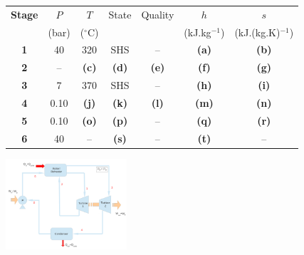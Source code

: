 \documentclass[10pt,compress]{beamer}
\begin{document}
\begin{frame}
       \begin{center}
         \begin{tabular}{c | c c c c c c  }
           \hline\scriptsize
           {\bf Stage} & $P$    & $T$             &  State       & Quality     & $h$                 & $s$                      \\
                       & (bar)  & ($^{\circ}$C)    &              &             & (kJ.kg$^{-1}$)       & (kJ.(kg.K)$^{-1}$)        \\
           \hline
            {\bf 1 }   & 40         & 320         & SHS          & --          & {\bf (a)}           & {\bf (b)}                 \\
            {\bf 2 }   &  --        & {\bf (c)}   & {\bf (d)}    & {\bf (e)}   & {\bf (f)}           & {\bf (g)}          \\
            {\bf 3 }   & 7          & 370         & SHS          & --          & {\bf (h)}           & {\bf (i)}                 \\
            {\bf 4 }   & 0.10       & {\bf (j)}   & {\bf (k)}    & {\bf (l)}   & {\bf (m)}           & {\bf (n)}                     \\
            {\bf 5 }   & 0.10       & {\bf (o)}   & {\bf (p)}    & --          & {\bf (q)}           & {\bf (r)}    \\
            {\bf 6 }   & 40         & --          & {\bf (s)}    & --          & {\bf (t)}           & --                      \\
           \hline
         \end{tabular}
        \end{center}
         \begin{center}
            \includegraphics[width=4.5cm,clip]{./Pics/Exam_Reheat_Rankine_Cycle}
         \end{center}

\end{frame} 
\end{document}
